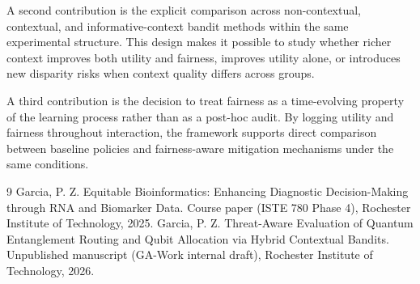 \documentclass{IEEEtran}
\begin{document}
A second contribution is the explicit comparison across non-contextual,
contextual, and informative-context bandit methods within the same
experimental structure. This design makes it possible to study whether richer
context improves both utility and fairness, improves utility alone, or
introduces new disparity risks when context quality differs across groups.

A third contribution is the decision to treat fairness as a time-evolving
property of the learning process rather than as a post-hoc audit. By logging
utility and fairness throughout interaction, the framework supports direct
comparison between baseline policies and fairness-aware mitigation mechanisms
under the same conditions.

\begin{thebibliography}{9}\setlength{\itemsep}{0em}
Garcia, P. Z. Equitable Bioinformatics: Enhancing Diagnostic Decision-Making through {RNA}
and Biomarker Data. Course paper (ISTE 780 Phase 4), Rochester Institute of Technology,
2025.
Garcia, P. Z. Threat-Aware Evaluation of Quantum Entanglement Routing and Qubit Allocation
via Hybrid Contextual Bandits. Unpublished manuscript (GA-Work internal draft), Rochester
Institute of Technology, 2026.
\end{thebibliography}
\end{document}

